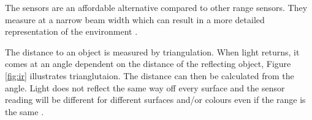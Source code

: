 The sensors are an affordable alternative compared to other range sensors. They measure at a narrow beam width which can result in a more detailed representation of the environment \cite{infrared}.

The distance to an object is measured by triangulation. When light returns, it comes at an angle dependent on the distance of the reflecting object, Figure \ref{fig:ir} illustrates trianglutaion. The distance can then be calculated from the angle. Light does not reflect the same way off every surface and the sensor reading will be different for different surfaces and/or colours even if the range is the same \cite{infrared}.

